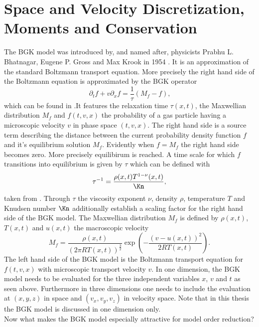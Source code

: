 \section{Space and Velocity Discretization, Moments and Conservation}
The BGK model was introduced by, and named after, physicists Prabhu L. Bhatnagar, Eugene P. Gross and Max Krook in 1954 \cite{BGK}. It is an approximation of the standard Boltzmann transport equation. More precisely the right hand side of the Boltzmann equation is approximated by the BGK operator 
\begin{equation}
\partial_t f + v \partial_x f = \frac{1}{\tau} (M_f - f) \text{,}
\label{Eq:BGK}
\end{equation}
which can be found in \cite{puppo2019kinetic}.It features the relaxation time \(\tau(x,t)\), the Maxwellian distribution \(M_f\) and \(f(t,v,x)\) the probability of a gas particle having a microscopic velocity \(v\) in phase space \((t,v,x)\). The right hand side is a source term describing the distance between the current probability density function \(f\) and it's equilibrium solution \(M_f\). Evidently when \(f = M_f\) the right hand side becomes zero. More precisely equilibirum is reached. A time scale for which \(f\) transitions into equilibrium is given by \(\tau\) which can be defined with
\begin{equation}
	\tau^{-1} = \frac{\rho(x,t)T^{1-\nu}(x,t)}{\Kn}\mathrm{,}
\end{equation}
taken from \cite{Bernard}. Through \(\tau\) the viscosity exponent \(\nu\), density \(\rho\), temperature \(T\) and Knudsen number \(\Kn\) additionally establish a scaling factor for the right hand side of the BGK model. The Maxwellian distribution \(M_f\) is defined by \(\rho(x,t)\), \(T(x,t)\) and \(u(x,t)\) the macroscopic velocity
\begin{equation}
M_f = \frac{\rho(x,t)}{(2\pi R T(x,t))^{\frac{3}{2}}}\exp(-\frac{(v - u(x,t))^2}{2 R T(x,t)}) \text{.}
\end{equation} 
The left hand side of the BGK model is the Boltzmann transport equation for \(f(t,v,x)\) with microscopic transport velocity \(v\).
In one dimension, the BGK model needs to be evaluated for the three independent variables \(x\), \(v\) and \(t\) as seen above. Furthermore in three dimensions one needs to include the evaluation at \((x,y,z)\) in space and \((v_x,v_y,v_z)\) in velocity space. Note that in this thesis the BGK model is discussed in one dimension only.\\ 
Now what makes the BGK model especially attractive for model order reduction?
